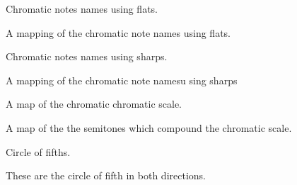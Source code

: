\documentclass[letterpaper,10pt,english]{sphinxmanual}
\begin{document}
\begin{fulllineitems}
\label{\detokenize{birdears:birdears.CHROMATIC_FLAT}}
 \textendash{} Chromatic notes names using flats.

A mapping of the chromatic note names using flats.

\end{fulllineitems}


\begin{fulllineitems}
\label{\detokenize{birdears:birdears.CHROMATIC_SHARP}}
 \textendash{} Chromatic notes names using sharps.

A mapping of the chromatic note namesu sing sharps

\end{fulllineitems}


\begin{fulllineitems}
\label{\detokenize{birdears:birdears.CHROMATIC_TYPE}}
 \textendash{} A map of the chromatic chromatic scale.

A map of the the semitones which compound the chromatic scale.

\end{fulllineitems}


\begin{fulllineitems}
\label{\detokenize{birdears:birdears.CIRCLE_OF_FIFTHS}}
 \textendash{} Circle of fifths.

These are the circle of fifth in both directions.

\end{fulllineitems}
\end{document}
